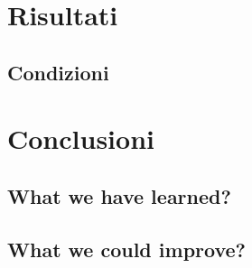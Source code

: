 \documentclass[compress]{beamer}
\begin{document}
\section*{Risultati}

\subsection*{Condizioni}


\section*{Conclusioni}

\subsection*{What we have learned?}

\subsection*{What we could improve?}
\end{document}
